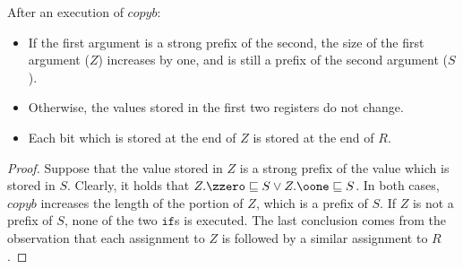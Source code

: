 \begin{lemma}\label{lemma:copyCor}
After an execution of $copyb$:
\begin{itemize}
\item If the first argument is a strong prefix of the second,
the size of the first argument ($Z$)
increases by one, and is still a prefix of the
second argument ($S$).
%
\item Otherwise, the values stored in the first
two registers do not change.
%
\item Each bit which is stored at the end of
$Z$ is stored at the end of $R$.
\end{itemize}
\end{lemma}

\begin{proof}
Suppose that the value stored in $Z$
is a strong prefix of the value
which is stored in $S$.
Clearly, it holds that
{$Z.\zzero \sqsubseteq S
\vee Z.\oone\sqsubseteq S$}.
In both cases, $copyb$
increases the length of the portion
of $Z$, which is a prefix of $S$.
If $Z$ is not a prefix of $S$, none of
the two $\mathtt{if}$s is executed.
The last conclusion comes from the observation
that each assignment to $Z$ is followed by
a similar assignment to $R$.
\end{proof}



